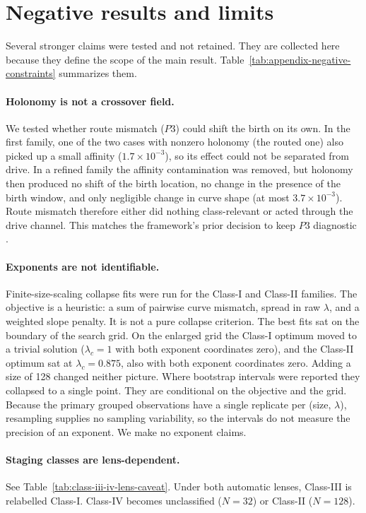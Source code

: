 \section{Negative results and limits}
\label{app:negative-results}

Several stronger claims were tested and not retained. They are collected here because they define the scope of the main result. Table~\ref{tab:appendix-negative-constraints} summarizes them.

\paragraph{Holonomy is not a crossover field.} We tested whether route mismatch ($P3$) could shift the birth on its own. In the first family, one of the two cases with nonzero holonomy (the routed one) also picked up a small affinity ($1.7\times10^{-3}$), so its effect could not be separated from drive. In a refined family the affinity contamination was removed, but holonomy then produced no shift of the birth location, no change in the presence of the birth window, and only negligible change in curve shape (at most $3.7\times10^{-3}$). Route mismatch therefore either did nothing class-relevant or acted through the drive channel. This matches the framework's prior decision to keep $P3$ diagnostic \cite{sixbirds_protocol_trap}.

\paragraph{Exponents are not identifiable.} Finite-size-scaling collapse fits were run for the Class-I and Class-II families. The objective is a heuristic: a sum of pairwise curve mismatch, spread in raw $\lambda$, and a weighted slope penalty. It is not a pure collapse criterion. The best fits sat on the boundary of the search grid. On the enlarged grid the Class-I optimum moved to a trivial solution ($\lambda_c=1$ with both exponent coordinates zero), and the Class-II optimum sat at $\lambda_c=0.875$, also with both exponent coordinates zero. Adding a size of 128 changed neither picture. Where bootstrap intervals were reported they collapsed to a single point. They are conditional on the objective and the grid. Because the primary grouped observations have a single replicate per (size, $\lambda$), resampling supplies no sampling variability, so the intervals do not measure the precision of an exponent. We make no exponent claims.

\paragraph{Staging classes are lens-dependent.} See Table~\ref{tab:class-iii-iv-lens-caveat}. Under both automatic lenses, Class-III is relabelled Class-I. Class-IV becomes unclassified ($N=32$) or Class-II ($N=128$).

